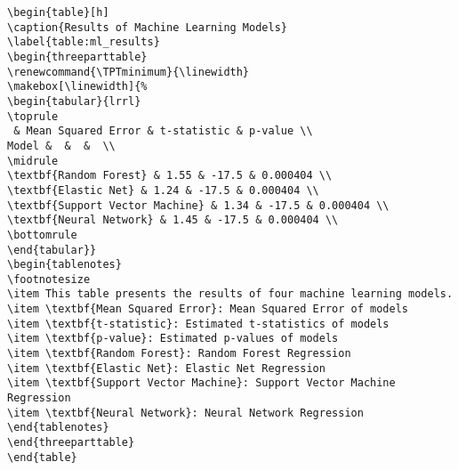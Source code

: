 \documentclass[11pt]{article}
\begin{document}
\begin{Verbatim}[tabsize=4]
\begin{table}[h]
\caption{Results of Machine Learning Models}
\label{table:ml_results}
\begin{threeparttable}
\renewcommand{\TPTminimum}{\linewidth}
\makebox[\linewidth]{%
\begin{tabular}{lrrl}
\toprule
 & Mean Squared Error & t-statistic & p-value \\
Model &  &  &  \\
\midrule
\textbf{Random Forest} & 1.55 & -17.5 & 0.000404 \\
\textbf{Elastic Net} & 1.24 & -17.5 & 0.000404 \\
\textbf{Support Vector Machine} & 1.34 & -17.5 & 0.000404 \\
\textbf{Neural Network} & 1.45 & -17.5 & 0.000404 \\
\bottomrule
\end{tabular}}
\begin{tablenotes}
\footnotesize
\item This table presents the results of four machine learning models.
\item \textbf{Mean Squared Error}: Mean Squared Error of models
\item \textbf{t-statistic}: Estimated t-statistics of models
\item \textbf{p-value}: Estimated p-values of models
\item \textbf{Random Forest}: Random Forest Regression
\item \textbf{Elastic Net}: Elastic Net Regression
\item \textbf{Support Vector Machine}: Support Vector Machine Regression
\item \textbf{Neural Network}: Neural Network Regression
\end{tablenotes}
\end{threeparttable}
\end{table}

\end{Verbatim}




\end{document}
